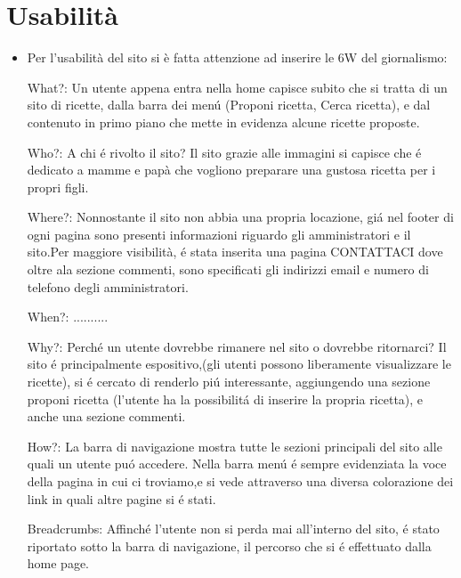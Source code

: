 \documentclass[12pt]{article}
\begin{document}
			\section{Usabilit\`a}
			\begin{itemize}
				\item Per l'usabilit\`a del sito si è fatta attenzione ad inserire le 6W del giornalismo:
				
				\subitem What?: 
				Un utente appena entra nella home capisce subito che si tratta di un sito di ricette, dalla barra dei men\'u (Proponi ricetta, Cerca ricetta), e dal contenuto in primo piano che mette in evidenza alcune ricette proposte.
				
				\subitem Who?:
				 A chi \'e rivolto il sito? Il sito grazie alle immagini si capisce che \'e dedicato a mamme e pap\`a
				che vogliono preparare una gustosa ricetta per i propri figli.
				
				\subitem Where?: 
				Nonnostante il sito non abbia una propria locazione, gi\'a  nel footer di ogni pagina sono presenti informazioni riguardo gli amministratori e il sito.Per maggiore visibilit\`a, \'e stata inserita una pagina CONTATTACI dove oltre ala sezione commenti, sono specificati gli indirizzi email e numero di telefono degli amministratori. 
				
				When?: ..........
				
				\subitem Why?: 
				Perch\'e un utente dovrebbe rimanere nel sito o dovrebbe ritornarci? Il sito \'e principalmente espositivo,(gli utenti possono liberamente visualizzare le ricette), si \'e cercato di renderlo pi\'u interessante, aggiungendo una sezione proponi ricetta (l'utente ha la possibilit\'a di inserire la propria ricetta), e anche una sezione commenti.
				
				\subitem How?:
				 La barra di navigazione mostra tutte le sezioni principali del sito alle quali un utente pu\'o accedere.
				Nella barra men\'u \'e sempre evidenziata la voce della pagina in cui ci troviamo,e si vede attraverso una diversa colorazione dei link in quali altre pagine si \'e stati. 

				
				Breadcrumbs: Affinch\'e l'utente non si perda mai all'interno del sito, \'e stato riportato sotto la barra di navigazione, il percorso che si \'e effettuato dalla home page.
				
			\end{itemize}
\end{document}
